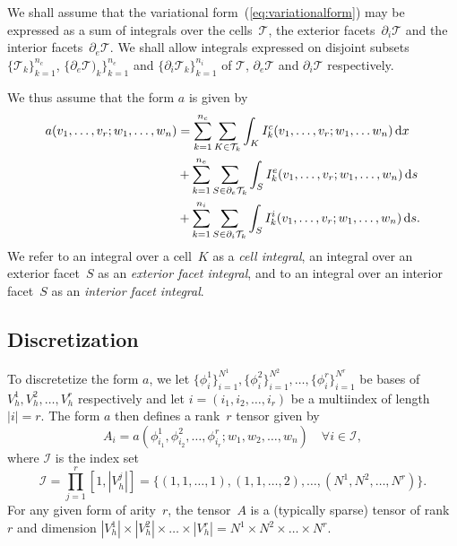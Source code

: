 We shall assume that the variational form~(\ref{eq:variationalform})
may be expressed as a sum of integrals over the cells~$\mathcal{T}$,
the exterior facets~$\partial_i \mathcal{T}$ and the interior
facets~$\partial_e \mathcal{T}$. We shall allow integrals expressed on
disjoint subsets $\{\mathcal{T}_k\}_{k=1}^{n_c}$, $\{\partial_e
\mathcal{T})_k\}_{k=1}^{n_e}$ and $\{\partial_i
\mathcal{T}_k\}_{k=1}^{n_i}$ of $\mathcal{T}$, $\partial_e
\mathcal{T}$ and $\partial_i \mathcal{T}$ respectively.

We thus assume that the form $a$ is given by
\begin{equation}
  \begin{split}
    a(v_1, \ldots, v_r; w_1, \ldots,  w_n)
    &=
    \sum_{k=1}^{n_c} \sum_{K\in\mathcal{T}_k} \int_{K}
    I^c_k(v_1, \ldots, v_r; w_1, \ldots w_n) \, \mathrm{d}x \\
    &+
    \sum_{k=1}^{n_e} \sum_{S\in\partial_e\mathcal{T}_k} \int_{S}
    I^e_k(v_1, \ldots, v_r; w_1, \ldots,  w_n) \, \mathrm{d}s \\
    &+
    \sum_{k=1}^{n_i} \sum_{S\in\partial_i\mathcal{T}_k} \int_{S}
    I^i_k(v_1, \ldots, v_r; w_1, \ldots, w_n) \, \mathrm{d}s.
  \end{split} \label{eq:form_integrals}
\end{equation}
We refer to an integral over a cell~$K$ as a \emph{cell integral},
an integral over an exterior facet~$S$ as an \emph{exterior facet integral},
and to an integral over an interior facet~$S$ as an \emph{interior facet integral}.

\subsection{Discretization}
\label{sec:Discretization}

To discretetize the form $a$, we let
$\{\phi_i^1\}_{i=1}^{N^1},
 \{\phi_i^2\}_{i=1}^{N^2}, \ldots,
 \{\phi_i^r\}_{i=1}^{N^r}$
be bases of $V_h^1, V_h^2, \ldots, V_h^r$ respectively and let $i =
(i_1, i_2, \ldots, i_r)$ be a multiindex of length $|i| = r$. The
form $a$ then defines a rank~$r$ tensor given by
\begin{equation} \label{eq:tensor}
  A_i = a(\phi_{i_1}^1, \phi_{i_2}^2, \ldots, \phi_{i_r}^r; w_1, w_2, \ldots, w_n)
  \quad \forall i \in \mathcal{I},
\end{equation}
where $\mathcal{I}$ is the index set
\begin{equation}
  \mathcal{I} = 
  \prod_{j=1}^r[1,|V^j_h|] = \{(1,1,\ldots,1), (1,1,\ldots,2), \ldots,
  (N^1,N^2,\ldots,N^r)\}.
\end{equation}
For any given form of arity~$r$, the tensor~$A$ is a
(typically sparse) tensor of rank~$r$ and dimension
$|V_h^1| \times |V_h^2| \times \ldots \times |V_h^r|
= N^1 \times N^2 \times \ldots \times N^r$.

